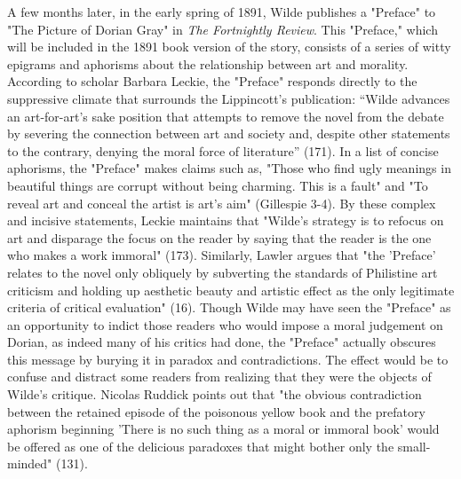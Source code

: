 \documentclass[11pt]{article}
\begin{document}
A few months later, in the early spring of 1891, Wilde publishes a
"Preface" to "The Picture of Dorian Gray" in \emph{The Fortnightly
Review}. This "Preface," which will be included in the 1891 book
version of the story, consists of a series of witty epigrams and
aphorisms about the relationship between art and morality. According
to scholar Barbara Leckie, the "Preface" responds directly to the
suppressive climate that surrounds the Lippincott’s publication:
“Wilde advances an art-for-art’s sake position that attempts to remove
the novel from the debate by severing the connection between art and
society and, despite other statements to the contrary, denying the
moral force of literature” (171). In a list of concise aphorisms, the
"Preface" makes claims such as, "Those who find ugly meanings in
beautiful things are corrupt without being charming. This is a fault"
and "To reveal art and conceal the artist is art’s aim" (Gillespie
3-4). By these complex and incisive statements, Leckie maintains that
"Wilde's strategy is to refocus on art and disparage the focus on the
reader by saying that the reader is the one who makes a work immoral"
(173). Similarly, Lawler argues that "the 'Preface' relates to the
novel only obliquely by subverting the standards of Philistine art
criticism and holding up aesthetic beauty and artistic effect as the
only legitimate criteria of critical evaluation" (16). Though Wilde
may have seen the "Preface" as an opportunity to indict those readers
who would impose a moral judgement on Dorian, as indeed many of his
critics had done, the "Preface" actually obscures this message by
burying it in paradox and contradictions. The effect would be to
confuse and distract some readers from realizing that they were the
objects of Wilde’s critique. Nicolas Ruddick points out that "the
obvious contradiction between the retained episode of the poisonous
yellow book and the prefatory aphorism beginning 'There is no such
thing as a moral or immoral book' would be offered as one of the
delicious paradoxes that might bother only the small-minded"
(131).
\end{document}
